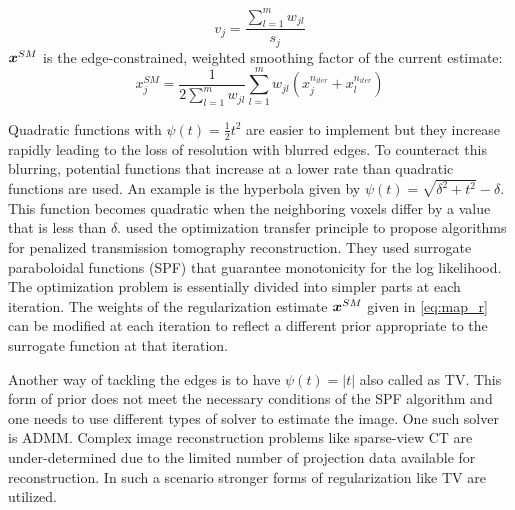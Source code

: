 \begin{equation}\label{eq:map_v}
v_{j}=\frac{\sum_{l=1}^{m} w_{j l}}{s_{j}}
\end{equation}
$\bm{x}^{SM}$ is the edge-constrained, weighted smoothing factor of the current estimate:
\begin{equation}\label{eq:map_r}
x_{j}^{S M}=\frac{1}{2 \sum_{l=1}^{m} w_{j l}} \sum_{l=1}^{m} w_{j l}\left(x_{j}^{n_{iter}}+x_{l}^{n_{iter}}\right)
\end{equation}

Quadratic functions with $\psi(t) = \frac{1}{2} t^2$ are easier to implement but they increase rapidly leading to the loss of resolution with blurred edges. To counteract this blurring, potential functions that increase at a lower rate than quadratic functions are used. An example is the hyperbola given by $\psi(t)=\sqrt{\delta^{2}+t^{2}}-\delta$. This function becomes quadratic when the neighboring voxels differ by a value that is less than $\delta$. \cite{erdogan2002monotonic} used the optimization transfer principle to propose algorithms for penalized transmission tomography reconstruction. They used surrogate paraboloidal functions (SPF) that guarantee monotonicity for the log likelihood. The optimization problem is essentially divided into simpler parts at each iteration. The weights of the regularization estimate $\bm{x}^{S M}$ given in \ref{eq:map_r} can be modified at each iteration to reflect a different prior appropriate to the surrogate function at that iteration.   

Another way of tackling the edges is to have $\psi(t)=|t|$ also called as \ac{TV}. This form of prior does not meet the necessary conditions of the SPF algorithm and one needs to use different types of solver to estimate the image. One such solver is \ac{ADMM}. Complex image reconstruction problems like sparse-view \ac{CT} are under-determined due to the limited number of projection data available for reconstruction. In such a scenario stronger forms of regularization like \ac{TV} are utilized. 




